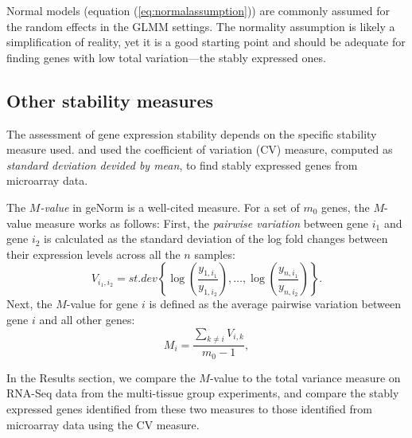 \documentclass[letterpaper,12pt]{article}
\begin{document}
Normal models (equation (\ref{eq:normalassumption})) are commonly assumed for
the random effects in the GLMM settings. The normality assumption is likely a
simplification of reality, yet it is a good starting point and should be
adequate for finding genes with low total variation---the stably expressed
ones.

\subsection{Other stability measures}\label{subsection:OtherStabilityMeasure}
The assessment of gene expression stability depends on the specific stability
measure used. 
\citeauthor{czechowski2005genome} and \citeauthor{dekkers2012identification} used  the
coefficient of variation (CV) measure, computed as \textit{standard
	deviation devided by mean}, to find stably expressed genes from microarray data.


The \textit{$M$-value} in geNorm \citep{vandesompele2002accurate} is a
well-cited measure. For a set of $m_0$ genes, the $M$-value measure works as
follows: First, the {\em pairwise variation} between gene $i_1$ and gene $i_2$ is
calculated as the standard deviation of the log fold changes between their
expression levels across all the $n$ samples: 
\[V_{i_1, i_2} =\textit{st.dev}
\left\{\log\left(\dfrac{y_{1,i_1}}{y_{1, i_2}}\right),\ldots,
\log\left(\dfrac{y_{n, i_1}}{y_{n, i_2}}\right) \right\}.\]
Next, the $M$-value for gene $i$ is defined as the average pairwise
variation between gene $i$ and all other genes:
\[M_{i} = \frac{\sum_{k\neq i}V_{i, k}}{m_0-1},\] 


In the Results section, we compare the $M$-value to the total variance measure
on RNA-Seq data from the multi-tissue group experiments, and compare the
stably expressed genes identified from these two measures to those identified
from microarray data using the CV measure.
\end{document}
